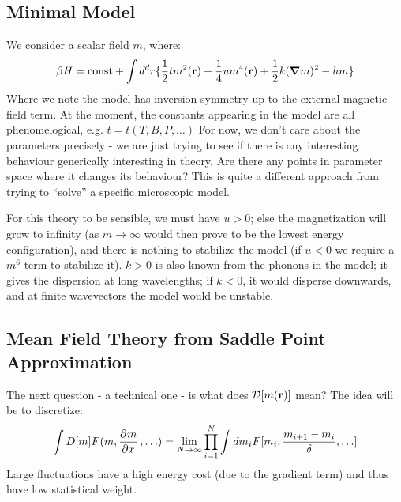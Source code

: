 \subsection{Minimal Model}
We consider a scalar field $m$, where:
\begin{equation}
    \beta H = \text{const} + \int d^dr\{\frac{1}{2}tm^2(\v{r}) + \frac{1}{4}um^4(\v{r}) + \frac{1}{2}k(\nabla m)^2 - hm\}
\end{equation}
Where we note the model has inversion symmetry up to the external magnetic field term. At the moment, the constants appearing in the model are all phenomelogical, e.g. $t = t(T, B, P, \ldots)$ For now, we don't care about the parameters precisely - we are just trying to see if there is any interesting behaviour generically interesting in theory. Are there any points in parameter space where it changes its behaviour? This is quite a different approach from trying to ``solve'' a specific microscopic model.

For this theory to be sensible, we must have $u > 0$; else the magnetization will grow to infinity (as $m \to \infty$ would then prove to be the lowest energy configuration), and there is nothing to stabilize the model (if $u < 0$ we require a $m^6$ term to stabilize it). $k > 0$ is also known from the phonons in the model; it gives the dispersion at long wavelengths; if $k < 0$, it would disperse downwards, and at finite wavevectors the model would be unstable.

\subsection{Mean Field Theory from Saddle Point Approximation}

The next question - a technical one - is what does $\mathcal{D}[m(\mathbf{r})]$ mean? The idea will be to discretize:
\begin{equation}
    \int D[m] F(m, \dpd{m}{x}, \ldots) = \lim_{N \to \infty}\prod_{i=1}^N \int dm_i F[m_i, \frac{m_{i+1} - m_i}{\delta}, \ldots]
\end{equation}
Large fluctuations have a high energy cost (due to the gradient term) and thus have low statistical weight. 

